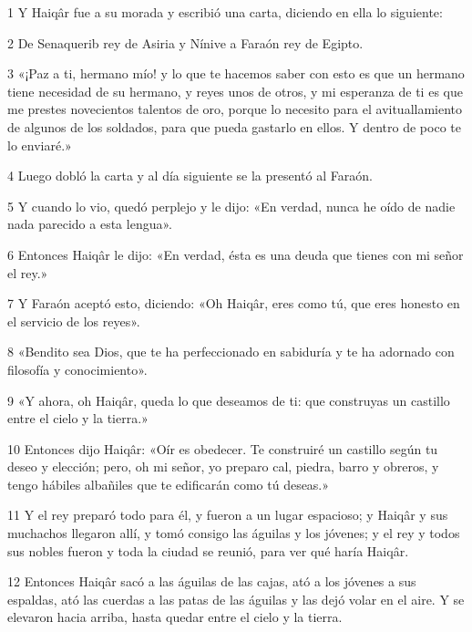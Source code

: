 \par 1 Y Haiqâr fue a su morada y escribió una carta, diciendo en ella lo siguiente:

\par 2 De Senaquerib rey de Asiria y Nínive a Faraón rey de Egipto.

\par 3 «¡Paz a ti, hermano mío! y lo que te hacemos saber con esto es que un hermano tiene necesidad de su hermano, y reyes unos de otros, y mi esperanza de ti es que me prestes novecientos talentos de oro, porque lo necesito para el avituallamiento de algunos de los soldados, para que pueda gastarlo en ellos. Y dentro de poco te lo enviaré.»

\par 4 Luego dobló la carta y al día siguiente se la presentó al Faraón.

\par 5 Y cuando lo vio, quedó perplejo y le dijo: «En verdad, nunca he oído de nadie nada parecido a esta lengua».

\par 6 Entonces Haiqâr le dijo: «En verdad, ésta es una deuda que tienes con mi señor el rey.»

\par 7 Y Faraón aceptó esto, diciendo: «Oh Haiqâr, eres como tú, que eres honesto en el servicio de los reyes».

\par 8 «Bendito sea Dios, que te ha perfeccionado en sabiduría y te ha adornado con filosofía y conocimiento».

\par 9 «Y ahora, oh Haiqâr, queda lo que deseamos de ti: que construyas un castillo entre el cielo y la tierra.»

\par 10 Entonces dijo Haiqâr: «Oír es obedecer. Te construiré un castillo según tu deseo y elección; pero, oh mi señor, yo preparo cal, piedra, barro y obreros, y tengo hábiles albañiles que te edificarán como tú deseas.»

\par 11 Y el rey preparó todo para él, y fueron a un lugar espacioso; y Haiqâr y sus muchachos llegaron allí, y tomó consigo las águilas y los jóvenes; y el rey y todos sus nobles fueron y toda la ciudad se reunió, para ver qué haría Haiqâr.

\par 12 Entonces Haiqâr sacó a las águilas de las cajas, ató a los jóvenes a sus espaldas, ató las cuerdas a las patas de las águilas y las dejó volar en el aire. Y se elevaron hacia arriba, hasta quedar entre el cielo y la tierra.

